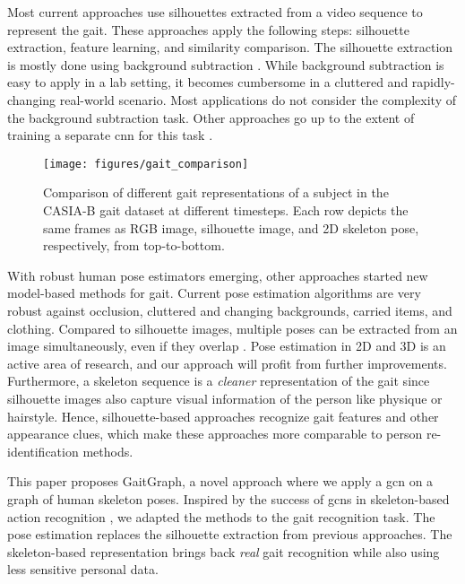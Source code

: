\documentclass{article}
\begin{document}
Most current approaches \cite{song2019gaitnet, chao2019gaitset, fan2020gaitpart} use silhouettes extracted from a video sequence to represent the gait. These approaches apply the following steps: silhouette extraction, feature learning, and similarity comparison. The silhouette extraction is mostly done using background subtraction \cite{wang2003silhouette}. While background subtraction is easy to apply in a lab setting, it becomes cumbersome in a cluttered and rapidly-changing real-world scenario. Most applications do not consider the complexity of the background subtraction task. Other approaches go up to the extent of training a separate \gls{cnn} for this task \cite{song2019gaitnet}.

\begin{figure}[t!]
  \begin{center}
\texttt{[image: figures/gait\_comparison]}
  \end{center}
  \caption{Comparison of different gait representations of a subject in the \mbox{CASIA-B} gait dataset at different timesteps. Each row depicts the same frames as RGB image, silhouette image, and 2D skeleton pose, respectively, from top-to-bottom.}
  \label{fig:gaitseq}
\end{figure}

With robust human pose estimators emerging, other approaches \cite{liao2017pose, liao2020model} started new model-based methods for gait. Current pose estimation algorithms are very robust against occlusion, cluttered and changing backgrounds, carried items, and clothing. Compared to silhouette images, multiple poses can be extracted from an image simultaneously, even if they overlap \cite{cheng2020bottom}. Pose estimation in 2D and 3D is an active area of research, and our approach will profit from further improvements.
Furthermore, a skeleton sequence is a \textit{cleaner} representation of the gait since silhouette images also capture visual information of the person like physique or hairstyle. Hence, silhouette-based approaches recognize gait features and other appearance clues, which make these approaches more comparable to person re-identification methods.


This paper proposes GaitGraph, a novel approach where we apply a \gls{gcn} on a graph of human skeleton poses.
Inspired by the success of \glspl{gcn} in skeleton-based action recognition \cite{yan2018spatial, song2020stronger}, we adapted the methods to the gait recognition task.
The pose estimation replaces the silhouette extraction from previous approaches. 
The skeleton-based representation brings back \textit{real} gait recognition while also using less sensitive personal data. 
\end{document}
